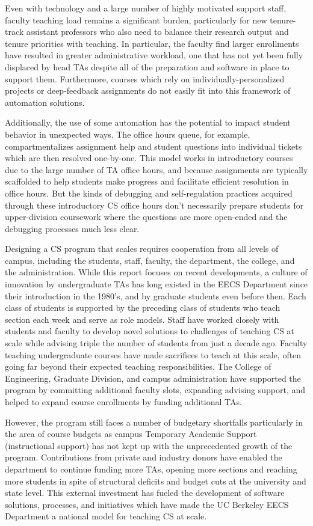 Even with technology and a large number of highly motivated support staff, faculty teaching load remains a significant burden, particularly for new tenure-track assistant professors who also need to balance their research output and tenure priorities with teaching. In particular, the faculty find larger enrollments have resulted in greater administrative workload, one that has not yet been fully displaced by head TAs despite all of the preparation and software in place to support them. Furthermore, courses which rely on individually-personalized projects or deep-feedback assignments do not easily fit into this framework of automation solutions.

Additionally, the use of some automation has the potential to impact student behavior in unexpected ways. The office hours queue, for example, compartmentalizes assignment help and student questions into individual tickets which are then resolved one-by-one. This model works in introductory courses due to the large number of TA office hours, and because assignments are typically scaffolded to help students make progress and facilitate efficient resolution in office hours. But the kinds of debugging and self-regulation practices acquired through these introductory CS office hours don't necessarily prepare students for upper-division coursework where the questions are more open-ended and the debugging processes much less clear.

Designing a CS program that scales requires cooperation from all levels of campus, including the students, staff, faculty, the department, the college, and the administration. While this report focuses on recent developments, a culture of innovation by undergraduate TAs has long existed in the EECS Department since their introduction in the 1980's, and by graduate students even before then. Each class of students is supported by the preceding class of students who teach section each week and serve as role models. Staff have worked closely with students and faculty to develop novel solutions to challenges of teaching CS at scale while advising triple the number of students from just a decade ago. Faculty teaching undergraduate courses have made sacrifices to teach at this scale, often going far beyond their expected teaching responsibilities. The College of Engineering, Graduate Division, and campus administration have supported the program by committing additional faculty slots, expanding advising support, and helped to expand course enrollments by funding additional TAs.

However, the program still faces a number of budgetary shortfalls particularly in the area of course budgets as campus Temporary Academic Support (instructional support) has not kept up with the unprecedented growth of the program. Contributions from private and industry donors have enabled the department to continue funding more TAs, opening more sections and reaching more students in spite of structural deficits and budget cuts at the university and state level. This external investment has fueled the development of software solutions, processes, and initiatives which have made the UC Berkeley EECS Department a national model for teaching CS at scale.
